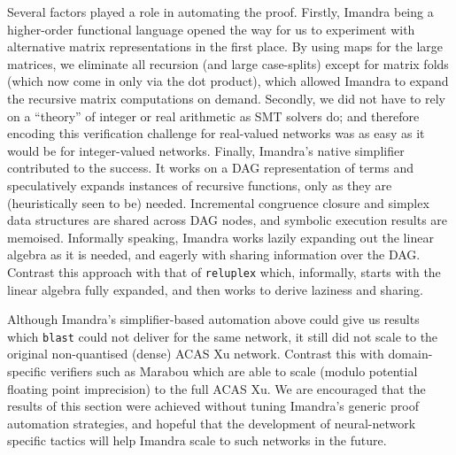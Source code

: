 \documentclass[runningheads]{llncs}
\newcommand{\knote}[1]{\todo[inline, color=blue!20]{#1}}
\begin{document}
Several factors played a role in automating the proof. Firstly, Imandra being a
higher-order functional language opened the way for us to experiment with
alternative matrix representations in the first place. By using maps for the
large matrices, we eliminate all recursion (and large case-splits) except for
matrix folds (which now come in only via the dot product), which allowed Imandra
to expand the recursive matrix computations on demand. 
Secondly, we did not have to rely on a ``theory'' of integer or real arithmetic as SMT solvers do; and therefore encoding this verification challenge
for real-valued networks was as easy as it would be for integer-valued networks.
Finally, Imandra's native simplifier contributed to the success. It works on a DAG representation of terms and speculatively expands instances of recursive functions, only as they are (heuristically seen to be) needed.
Incremental congruence closure and simplex data structures are shared across DAG nodes, and symbolic execution results are memoised.
Informally speaking, Imandra works lazily expanding out the linear algebra as it is needed, and eagerly with sharing information over the DAG.
Contrast this approach with that of \lstinline{reluplex} which, informally, starts with the linear algebra fully expanded, and then works to derive laziness and sharing. 


Although Imandra's simplifier-based automation above could give us results which
\lstinline{blast} could not deliver for the same network, it still did not scale
to the original non-quantised (dense) ACAS Xu network. Contrast this with
domain-specific verifiers such as Marabou which are able to scale (modulo
potential floating point imprecision) to the full ACAS Xu.
We are encouraged that the results of
this section were achieved without tuning Imandra's generic proof automation
strategies, and hopeful that the development of neural-network specific tactics %
will help Imandra
scale to such networks in the future.  
\end{document}
